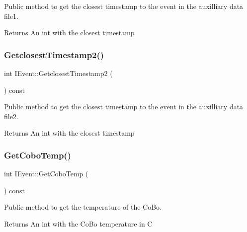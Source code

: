 Public method to get the closest timestamp to the event in the auxilliary data file1. 

\begin{DoxyReturn}{Returns}
An int with the closest timestamp 
\end{DoxyReturn}
\mbox{\label{classIEvent_a1e6f572dc2a804c962c776a6f5ec3cdf}} 
\subsubsection{\texorpdfstring{Getclosest\+Timestamp2()}{GetclosestTimestamp2()}}
{\footnotesize\ttfamily int I\+Event\+::\+Getclosest\+Timestamp2 (\begin{DoxyParamCaption}{ }\end{DoxyParamCaption}) const}



Public method to get the closest timestamp to the event in the auxilliary data file2. 

\begin{DoxyReturn}{Returns}
An int with the closest timestamp 
\end{DoxyReturn}
\mbox{\label{classIEvent_af871e86c8478223d55e3221c7590e3e7}} 
\subsubsection{\texorpdfstring{Get\+Cobo\+Temp()}{GetCoboTemp()}}
{\footnotesize\ttfamily int I\+Event\+::\+Get\+Cobo\+Temp (\begin{DoxyParamCaption}{ }\end{DoxyParamCaption}) const}



Public method to get the temperature of the Co\+Bo. 

\begin{DoxyReturn}{Returns}
An int with the Co\+Bo temperature in C 
\end{DoxyReturn}
\mbox{\label{classIEvent_a57da66c02aa6bec76d1d04e4993279f4}} 

